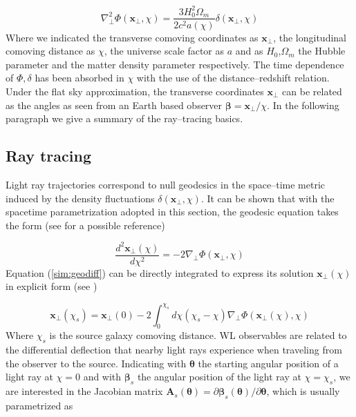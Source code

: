 \documentclass[reprint,aps,prd,superscriptaddress,showkeys,showpacs]{revtex4-1}
\newcommand{\bb}[1]{\mathbf{#1}}
\newcommand\pt{\pmb{\theta}}
\begin{document}
\begin{equation}
\label{sim:poisson}
\nabla_\perp^2\Phi(\bb{x}_\perp,\chi) = \frac{3H_0^2\Omega_m}{2c^2a(\chi)} \delta(\bb{x}_\perp,\chi)
\end{equation} 
%
Where we indicated the transverse comoving coordinates as $\bb{x}_\perp$, the longitudinal comoving distance as $\chi$, the universe scale factor as $a$ and as $H_0$,$\Omega_m$ the Hubble parameter and the matter density parameter respectively. The time dependence of $\Phi,\delta$ has been absorbed in $\chi$ with the use of the distance--redshift relation. Under the flat sky approximation, the transverse coordinates $\bb{x}_\perp$ can be related as the angles as seen from an Earth based observer $\pmb{\beta}=\bb{x}_\perp/\chi$. In the following paragraph we give a summary of the ray--tracing basics.   

\subsection{Ray tracing}
Light ray trajectories correspond to null geodesics in the space--time metric induced by the density fluctuations $\delta(\bb{x}_\perp,\chi)$. It can be shown that with the spacetime parametrization adopted in this section, the geodesic equation takes the form (see \citep{BornFlexion} for a possible reference)

\begin{equation}
\label{sim:geodiff}
\frac{d^2 \bb{x}_\perp(\chi)}{d\chi^2} = -2\nabla_\perp \Phi(\bb{x}_\perp,\chi)
\end{equation}
%
Equation (\ref{sim:geodiff}) can be directly integrated to express its solution $\bb{x}_\perp(\chi)$ in explicit form (see \citep{DodelsonWL}) 

\begin{equation}
\label{sim:geosol}
\bb{x}_\perp(\chi_s) = \bb{x}_\perp(0) -2\int_0^{\chi_s} d\chi (\chi_s-\chi) \nabla_\perp \Phi(\bb{x}_\perp(\chi),\chi)
\end{equation}
%
Where $\chi_s$ is the source galaxy comoving distance. WL observables are related to the differential deflection that nearby light rays experience when traveling from the observer to the source. Indicating with $\pt$ the starting angular position of a light ray at $\chi=0$ and with $\pmb{\beta}_s$ the angular position of the light ray at $\chi=\chi_s$, we are interested in the Jacobian matrix $\bb{A}_s(\pt)=\partial\pmb{\beta}_s(\pt)/\partial \pt$, which is usually parametrized as 
\end{document}
